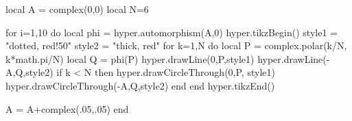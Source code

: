 \documentclass[margin=.2cm,multi,tikz]{standalone}
\begin{document}
\begin{luacode*}
local A = complex(0,0)
local N=6

for i=1,10 do
	local phi = hyper.automorphism(A,0)
	hyper.tikzBegin()
	style1 = "dotted, red!50"
	style2 =  "thick, red"
	for k=1,N do
		local P = complex.polar(k/N, k*math.pi/N)
		local Q = phi(P)
		hyper.drawLine(0,P,style1)
		hyper.drawLine(-A,Q,style2)
		if k < N then
			hyper.drawCircleThrough(0,P, style1)
			hyper.drawCircleThrough(-A,Q,style2)
		end
	end
	hyper.tikzEnd()
	
	A = A+complex(.05,.05)
end

\end{luacode*}
\end{document}
